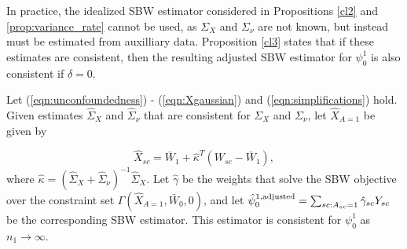 %

In practice, the idealized SBW estimator considered in Propositions \ref{cl2} and \ref{prop:variance_rate} cannot be used, as $\Sigma_X$ and $\Sigma_{\nu}$ are not known, but instead must be estimated from auxilliary data. Proposition \ref{cl3} states that if these estimates are consistent, then the resulting adjusted SBW estimator for $\psi_0^1$ is also consistent if $\delta = 0$.

\begin{proposition}\label{cl3}
Let (\ref{eqn:unconfoundedness}) - (\ref{eqn:Xgaussian}) and (\ref{eqn:simplifications}) hold. Given estimates $\hat{\Sigma}_X$ and $\hat{\Sigma}_\nu$ that are consistent for $\Sigma_X$ and $\Sigma_\nu$, let $\hat{X}_{A=1}$ be given by 

\[ \hat{X}_{sc} = \bar{W}_1 + \hat{\kappa}^T(W_{sc} - \bar{W}_1), \]
where $\hat{\kappa} = (\hat{\Sigma}_X + \hat{\Sigma}_{\nu})^{-1} \hat{\Sigma}_X$. Let $\hat{\gamma}$ be the weights that solve the SBW objective over the constraint set $\Gamma(\hat{X}_{A=1}, \bar{W}_0, 0)$, and let $\hat{\psi}^{1, \textup{adjusted}}_0 = \sum_{sc: A_{sc} = 1} \hat{\gamma}_{sc} Y_{sc}$ be the corresponding SBW estimator. This estimator is consistent for $\psi_0^1$ as $n_1 \to \infty$.
\end{proposition}




